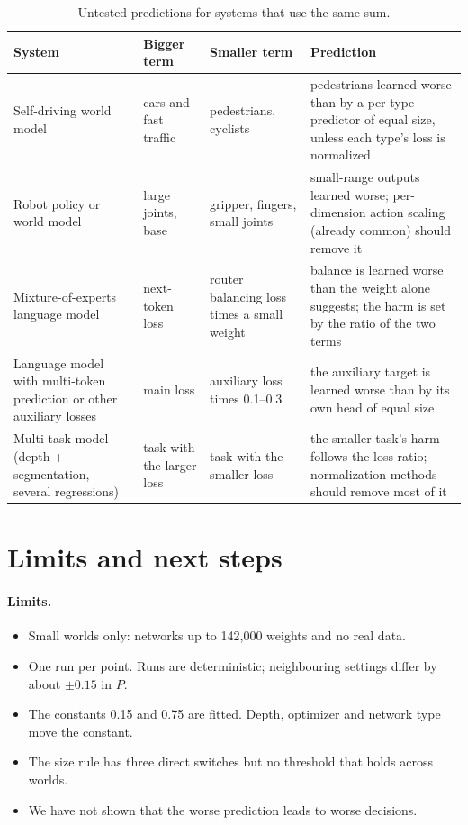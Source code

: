 \documentclass[11pt]{article}
\newcommand{\para}[1]{\paragraph{#1}}
\begin{document}
\begin{table}[h]
\centering\small
\caption{Untested predictions for systems that use the same sum.}
\label{tab:systems}
\begin{tabularx}{\linewidth}{@{}YYYY@{}}
\toprule
System & Bigger term & Smaller term & Prediction \\
\midrule
Self-driving world model & cars and fast traffic & pedestrians, cyclists & pedestrians learned worse than by a per-type predictor of equal size, unless each type's loss is normalized \\
Robot policy or world model & large joints, base & gripper, fingers, small joints & small-range outputs learned worse; per-dimension action scaling (already common) should remove it \\
Mixture-of-experts language model & next-token loss & router balancing loss times a small weight & balance is learned worse than the weight alone suggests; the harm is set by the ratio of the two terms \\
Language model with multi-token prediction or other auxiliary losses & main loss & auxiliary loss times 0.1--0.3 & the auxiliary target is learned worse than by its own head of equal size \\
Multi-task model (depth + segmentation, several regressions) & task with the larger loss & task with the smaller loss & the smaller task's harm follows the loss ratio; normalization methods should remove most of it \\
\bottomrule
\end{tabularx}
\end{table}

\section{Limits and next steps}
\label{sec:limits}

\para{Limits.}
\begin{itemize}
\item Small worlds only: networks up to 142,000 weights and no real data.
\item One run per point. Runs are deterministic; neighbouring settings differ by about $\pm0.15$ in $P$.
\item The constants 0.15 and 0.75 are fitted. Depth, optimizer and network type move the constant.
\item The size rule has three direct switches but no threshold that holds across worlds.
\item We have not shown that the worse prediction leads to worse decisions.
\end{itemize}
\end{document}
